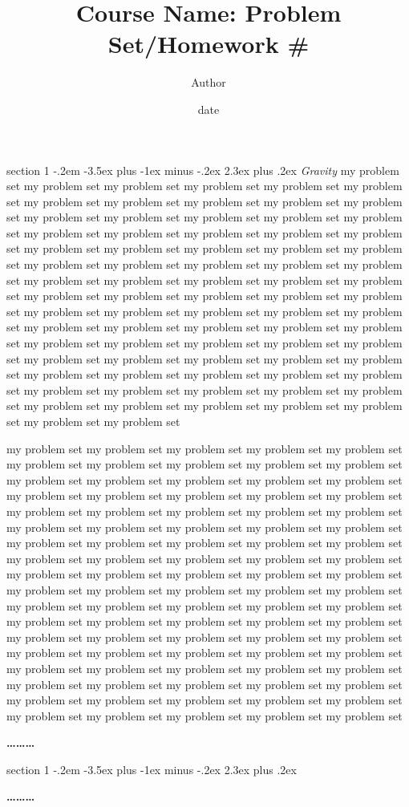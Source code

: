 \documentclass[12pt]{article}
\makeatletter
\newenvironment{problem}{\@startsection
       {section}
       {1}
       {-.2em}
       {-3.5ex plus -1ex minus -.2ex}
       {2.3ex plus .2ex}
       {\pagebreak[3]%
       \large\bf\noindent{Problem }
       }
       }
       {%
       \begin{center}\large\bf \ldots\ldots\ldots\end{center}}
\makeatother
\begin{document}
\title{Course Name: Problem Set/Homework \#}
\author{Author}
\date{date}

\maketitle

\thispagestyle{empty}

\begin{problem}{\it Gravity}
my problem set my problem set my problem set my problem set my problem set my problem set 
my problem set my problem set my problem set my problem set my problem set my problem set 
my problem set my problem set my problem set my problem set my problem set my problem set 
my problem set my problem set my problem set my problem set my problem set my problem set 
my problem set my problem set my problem set my problem set my problem set my problem set 
my problem set my problem set my problem set my problem set my problem set my problem set 
my problem set my problem set my problem set my problem set my problem set my problem set 
my problem set my problem set my problem set my problem set my problem set my problem set 
my problem set my problem set my problem set my problem set my problem set my problem set 
my problem set my problem set my problem set my problem set my problem set my problem set 
my problem set my problem set my problem set my problem set my problem set my problem set 
my problem set my problem set my problem set my problem set my problem set my problem set 
my problem set my problem set my problem set my problem set my problem set my problem set 

my problem set my problem set my problem set my problem set my problem set my problem set 
my problem set my problem set my problem set my problem set my problem set my problem set 
my problem set my problem set my problem set my problem set my problem set my problem set 
my problem set my problem set my problem set my problem set my problem set my problem set 
my problem set my problem set my problem set my problem set my problem set my problem set 
my problem set my problem set my problem set my problem set my problem set my problem set 
my problem set my problem set my problem set my problem set my problem set my problem set 
my problem set my problem set my problem set my problem set my problem set my problem set 
my problem set my problem set my problem set my problem set my problem set my problem set 
my problem set my problem set my problem set my problem set my problem set my problem set 
my problem set my problem set my problem set my problem set my problem set my problem set 
my problem set my problem set my problem set my problem set my problem set my problem set 
my problem set my problem set my problem set my problem set my problem set my problem set 
my problem set my problem set my problem set my problem set my problem set my problem set 
my problem set my problem set my problem set my problem set my problem set my problem set 

\end{problem}

\begin{problem}{}
\end{problem}
\end{document}
